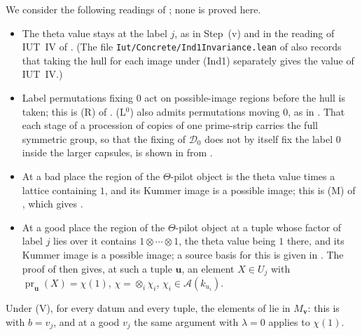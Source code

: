 \documentclass[11pt]{amsart}
\theoremstyle{remark}
\newcommand{\cA}{\mathcal A}
\newcommand{\pr}{\operatorname{pr}}
\newcommand{\bv}{\mathbf v}
\newcommand{\bu}{\mathbf u}
\begin{document}
We consider the following readings of \cite[Cor.~3.12]{IUT3}; none is proved here.
\begin{itemize}
\item[(V)] The theta value stays at the label $j$, as in Step~(v) and in the reading of IUT~IV of \cite{LANAiut}.
(The file \nolinkurl{Iut/Concrete/Ind1Invariance.lean} of \cite{LANAiut} also records that taking the hull for each
image under (Ind1) separately gives the value of IUT~IV.)
\item[(L)] Label permutations fixing $0$ act on possible-image regions before the hull is taken; this is (R) of
\cite[\S4]{Note}. (L$^0$) also admits permutations moving $0$, as in \cite[(SA2)]{FirstFull}. That each stage of a
procession of copies of one prime-strip carries the full symmetric group, so that the fixing of $\mathcal D_0$ does not
by itself fix the label $0$ inside the larger capsules, is shown in \cite[\S6]{Fourth} from \cite[\S0, Def.~4.10,
Prop.~6.9(i)]{IUT1}.
\item[(M$_{\mathrm b}$)] At a bad place the region of the $\Theta$-pilot object is the theta value times a lattice
containing $1$, and its Kummer image is a possible image; this is (M) of \cite[\S4]{Note}, which gives
\cite[Lemma~3]{Note}.
\item[(M$_{\mathrm g}$)] At a good place the region of the $\Theta$-pilot object at a tuple whose factor of label $j$
lies over it contains $1\otimes\cdots\otimes1$, the theta value being $1$ there, and its Kummer image is a possible
image; a source basis for this is given in \cite[\S7, (SA1)]{FirstFull}. The proof of
\cite[Lemma~3]{Note} then gives, at such a tuple $\bu$, an element $X\in U_j$ with $\pr_{\bu}(X)=\chi(1)$,
$\chi=\otimes_i\chi_i$, $\chi_i\in\cA(k_{u_i})$.
\end{itemize}
Under (V), for every datum and every tuple, the elements of \cite[Lemma~3]{Note} lie in $M_{\bv}$: this is
\cite[Prop.~6]{Note} with $b=v_j$, and at a good $v_j$ the same argument with $\lambda=0$ applies to $\chi(1)$.
\end{document}
